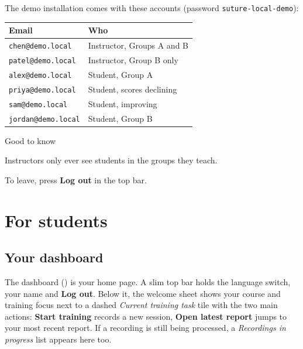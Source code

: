 \documentclass[11pt,a4paper]{article}
\newcommand{\ui}[1]{\textbf{\color{brand}\nohyphens{#1}}} %
\newcommand{\page}[1]{\leavevmode{\ttfamily\small\color{brandeight}#1}} %
\newcommand{\tiletitle}[2][brand]{{\display\large\color{brandeight}\textcolor{#1}{\raisebox{0.15ex}{\tikz\fill (0,0) circle (2.4pt);}}\hspace{0.45em}#2}\par\smallskip}
\begin{document}
\begin{minipage}[t]{0.56\linewidth}
\vspace{0pt}
\raggedright
The demo installation comes with these accounts (password \texttt{suture-local-demo}):

\smallskip
\small
\begin{tabularx}{\linewidth}{@{}l Y@{}}
\toprule
\textbf{Email} & \textbf{Who} \\
\midrule
\texttt{chen@demo.local} & Instructor, Groups A and B \\
\texttt{patel@demo.local} & Instructor, Group B only \\
\texttt{alex@demo.local} & Student, Group A \\
\texttt{priya@demo.local} & Student, scores declining \\
\texttt{sam@demo.local} & Student, improving \\
\texttt{jordan@demo.local} & Student, Group B \\
\bottomrule
\end{tabularx}
\end{minipage}\hfill
\begin{minipage}[t]{0.40\linewidth}
\vspace{0pt}
\begin{tilebox}
\tiletitle{Good to know}
\raggedright
Instructors only ever see students in the groups they teach.

\smallskip
To leave, press \ui{Log out} in the top bar.
\end{tilebox}
\end{minipage}

\section{For students}\label{sec:student}

\subsection{Your dashboard}
The dashboard (\page{/}) is your home page. A slim top bar holds the language switch, your name
and \ui{Log out}. Below it, the welcome sheet shows your course and training focus next to a
dashed \emph{Current training task} tile with the two main actions: \ui{Start training} records a
new session, \ui{Open latest report} jumps to your most recent report. If a recording is still
being processed, a \emph{Recordings in progress} list appears here too.
\end{document}
